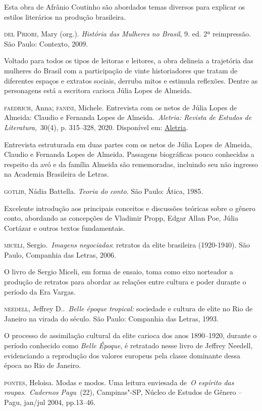 \documentclass[12pt]{extarticle}
\begin{document}
Esta obra de Afrânio Coutinho são abordados temas diversos para explicar 
os estilos literários na produção brasileira.

\textsc{del Priori}, Mary (org.). \emph{História das Mulheres no Brasil}, 9.
ed. 2ª reimpressão. São Paulo: Contexto, 2009. 

Voltado para todos os tipos de leitoras e leitores, a obra delineia a trajetória das
mulheres do Brasil com a participação de vinte historiadores que
tratam de diferentes espaços e extratos sociais, derruba mitos e
estimula reflexões. Dentre as personagens está a escritora carioca
Júlia Lopes de Almeida.

\textsc {faedrich}, Anna; \textsc{fanini}, Michele. Entrevista com os netos de Júlia
Lopes de Almeida: Claudio e Fernanda Lopes de Almeida.~\emph{Aletria:
Revista de Estudos de Literatura},~30(4), p. 315--328, 2020.
Disponível em: \href{https://doi.org/10.35699/2317-2096.2020.24495}{Aletria}.

Entrevista estruturada em duas partes com os netos de Júlia Lopes de
Almeida, Claudio e Fernanda Lopes de Almeida. Passagens biográficas
pouco conhecidas a respeito da avó e da família Almeida são
rememoradas, incluindo seu não ingresso na Academia Brasileira de
Letras.

\textsc{gotlib}, Nádia Battella. \emph{Teoria do conto}. São Paulo: Ática,
1985. 

Excelente introdução aos principais conceitos e discussões
teóricas sobre o gênero conto, abordando as concepções de Vladimir
Propp, Edgar Allan Poe, Júlia Cortázar e outros textos fundamentais.

\textsc{miceli}, Sergio.~\textit{Imagens negociadas}: retratos da elite
brasileira (1920-1940). São Paulo, Companhia das Letras, 2006.

O livro de Sergio Miceli, em forma de ensaio, toma como eixo norteador a produção de 
retratos para abordar as relações entre cultura e poder durante o período da Era Vargas.

\textsc{needell}, Jeffrey D..~\emph{Belle époque tropical:} sociedade
e cultura de elite no Rio de Janeiro na virada do século. São
Paulo: Companhia das Letras, 1993.

O processo de assimilação cultural da elite carioca dos anos 1890--1920, durante o 
período conhecido como \textit{Belle Époque}, é retratado nesse livro de Jeffrey Needell, evidenciando 
a reprodução dos valores europeus pela classe dominante dessa época no Rio de Janeiro.

\textsc{pontes}, Heloisa. Modas e modos. Uma leitura enviesada de~\emph{O
espírito das roupas}.~\textit{Cadernos Pagu}~(22), Campinas"-SP, Núcleo
de Estudos de Gênero -- Pagu, jan/jul 2004, pp.13--46.
\end{document}

